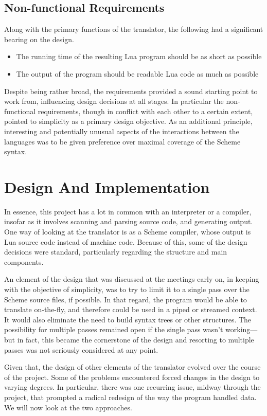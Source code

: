 \subsection{Non-functional Requirements}

Along with the primary functions of the translator, the following had a
significant bearing on the design.
\begin{itemize}
\item The running time of the resulting Lua program should be as short as
possible
\item The output of the program should be readable Lua code as much as possible
\end{itemize}

Despite being rather broad, the requirements provided a sound starting point to
work from, influencing design decisions at all stages. In particular the
non-functional requirements, though in conflict with each other to a certain
extent, pointed to simplicity as a primary design objective. As an additional
principle, interesting and potentially unusual aspects of the interactions
between the languages was to be given preference over maximal coverage of the
Scheme syntax.


\section{Design And Implementation}

In essence, this project has a lot in common with an interpreter or a compiler,
insofar as it involves scanning and parsing source code, and generating output.
One way of looking at the translator is as a Scheme compiler, whose output is
Lua source code instead of machine code. Because of this, some of the design
decisions were standard, particularly regarding the structure and main
components.

An element of the design that was discussed at the meetings early on, in keeping
with the objective of simplicity, was to try to limit it to a single pass over
the Scheme source files, if possible. In that regard, the program would be able
to translate on-the-fly, and therefore could be used in a piped or streamed
context. It would also eliminate the need to build syntax trees or other
structures. The possibility for multiple passes remained open if the single pass
wasn't working---but in fact, this became the cornerstone of the design and
resorting to multiple passes was not seriously considered at any point.

Given that, the design of other elements of the translator evolved over the
course of the project. Some of the problems encountered forced changes in the
design to varying degrees. In particular, there was one recurring issue, midway
through the project, that prompted a radical redesign of the way the program
handled data.  We will now look at the two approaches.


